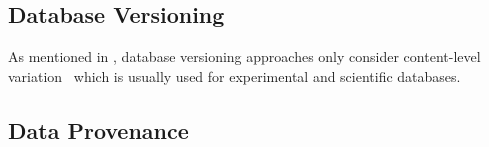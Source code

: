 \subsection{Database Versioning}
\label{sec:db-ver}
As mentioned in , database versioning approaches only consider
content-level variation~\cite{dbVersioning} which is usually used for experimental and
scientific databases.

\subsection{Data Provenance}
\label{sec:db-prov}

